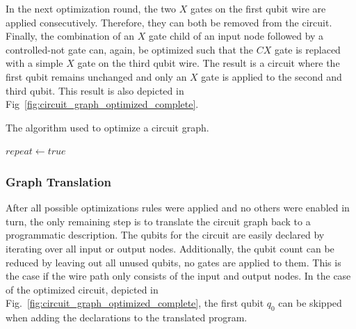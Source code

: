In the next optimization round, the two $X$ gates on the first qubit wire are applied consecutively. Therefore, they can both be removed from the circuit. Finally, the combination of an $X$ gate child of an input node followed by a controlled-not gate can, again, be optimized such that the $CX$ gate is replaced with a simple $X$ gate on the third qubit wire. The result is a circuit where the first qubit remains unchanged and only an $X$ gate is applied to the second and third qubit. This result is also depicted in Fig~\ref{fig:circuit_graph_optimized_complete}.   

\begin{algorithm}
    \caption{The algorithm used to optimize a circuit graph.}\label{alg:circuit_optimization}
    $repeat \gets true$\;
\end{algorithm}

\subsubsection{Graph Translation}
After all possible optimizations rules were applied and no others were enabled in turn, the only remaining step is to translate the circuit graph back to a programmatic description. The qubits for the circuit are easily declared by iterating over all input or output nodes. Additionally, the qubit count can be reduced by leaving out all unused qubits, \ie no gates are applied to them. This is the case if the wire path only consists of the input and output nodes. In the case of the optimized circuit, depicted in Fig.~\ref{fig:circuit_graph_optimized_complete}, the first qubit $q_0$ can be skipped when adding the declarations to the translated program. 

